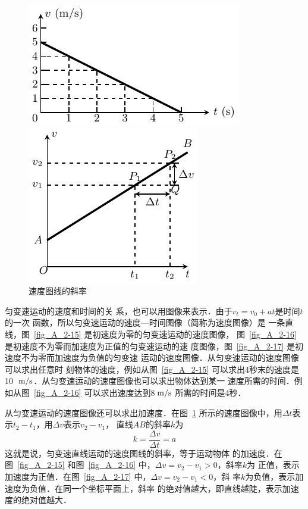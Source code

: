 \begin{figure}[htp]
    \centering
    \begin{minipage}[t]{0.48\textwidth}
        \centering
        \includegraphics{fig/A/2-17.pdf}
        \caption{$v_0=5 \Ums $，$  a=-1 \Umsq $}\label{fig_A_2-17}
    \end{minipage}
    \begin{minipage}[t]{0.48\textwidth}
        \centering
        \includegraphics{fig/A/2-18.pdf}
        \caption{速度图线的斜率}\label{fig_A_2-18}
    \end{minipage}
\end{figure}

匀变速运动的速度和时间的关
系，也可以用图像来表示．由于$v_t=v_0+at$是时间$t$的一次
函数，所以匀变速运动的速度—时间图像（简称为速度图像）是
一条直线，图~\ref{fig_A_2-15} 是初速度为零的匀变速运动的速度图像，
图~\ref{fig_A_2-16} 是初速度不为零而加速度为正值的匀变速运动的速
度图像，图~\ref{fig_A_2-17} 是初速度不为零而加速度为负值的匀变速
运动的速度图像．从匀变速运动的速度图像可以求出任意时
刻物体的速度，例如从图~\ref{fig_A_2-15} 可以求出4秒末的速度是10
$\;\text{m}/\text{s}$．从匀变速运动的速度图像也可以求出物体达到某一
速度所需的时间．例如从图~\ref{fig_A_2-16} 可以求出速度达到8$\;\text{m}/\text{s}$
所需的时间是4秒．


    从匀变速运动的速度图像还可以求出加速度．在图~\ref{fig_A_2-18} 所示的速度图像中，用$\Delta t$表示$t_2-t_1$，用$\Delta v$表示$v_2-v_1$，
直线$AB$的斜率$k$为
\[k=\frac{\Delta v}{\Delta t}=a \]
这就是说，匀变速直线运动的速度图线的斜率，等于运动物体
的加速度．在图~\ref{fig_A_2-15} 和图~\ref{fig_A_2-16} 中，$\Delta v=v_2-v_1>0$，斜率$k$为
正值，表示加速度为正值．在图~\ref{fig_A_2-17} 中，$\Delta v=v_2-v_1<0$，斜
率$k$为负值，表示加速度为负值．在同一个坐标平面上，斜率
的绝对值越大，即直线越陡，表示加速度的绝对值越大．

